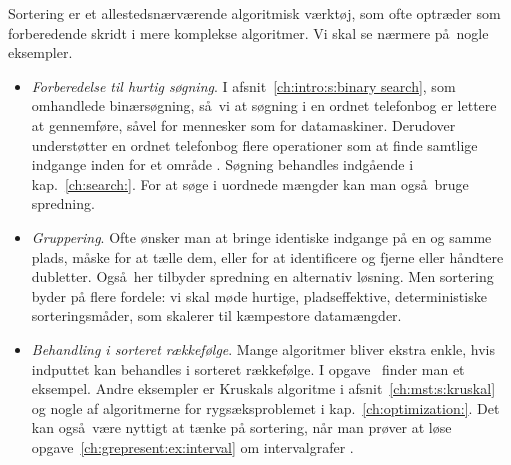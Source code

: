 Sortering er et allestedsnærværende algoritmisk værktøj, som ofte optræder som forberedende skridt
i mere komplekse algoritmer.
Vi skal se nærmere på nogle eksempler.

\begin{itemize}
\item 
\emph{Forberedelse til hurtig søgning}.
  I afsnit~\ref{ch:intro:s:binary search}, som omhandlede binærsøgning, så vi at søgning i en ordnet telefonbog er lettere at gennemføre, såvel for mennesker som for datamaskiner.
Derudover understøtter en ordnet telefonbog flere operationer som at finde samtlige indgange inden for et område .
Søgning behandles indgående i kap.~\ref{ch:search:}.
For at søge i uordnede mængder kan man også bruge spredning.
\item \emph{Gruppering}.
Ofte ønsker man at bringe identiske indgange på en og samme plads, måske for at tælle dem, eller for at identificere og fjerne eller håndtere dubletter.
  Også her tilbyder spredning en alternativ løsning. 
Men sortering byder på flere fordele: vi skal møde hurtige, pladseffektive, deterministiske 
sorteringsmåder, som skalerer til kæmpestore datamængder.
\item \emph{Behandling i sorteret rækkefølge}.
Mange algoritmer bliver ekstra enkle, hvis indputtet kan behandles i sorteret rækkefølge.
I opgave~ finder man et eksempel. 
Andre eksempler er Kruskals algoritme i afsnit~\ref{ch:mst:s:kruskal}  og nogle af algoritmerne for rygsæksproblemet i kap.~\ref{ch:optimization:}.
Det kan også være nyttigt at tænke på sortering, når man prøver at løse opgave~\ref{ch:grepresent:ex:interval} om intervalgrafer .
\end{itemize}

